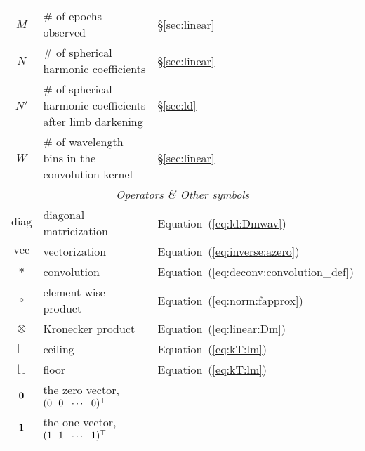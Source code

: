 \documentclass[modern]{aastex62}
\begin{document}
\begin{center}
\begin{longtable}{cll}
        $M$                                                 & \# of epochs observed                                        & \S\ref{sec:linear}                         \\
        $N$                                                 & \# of spherical harmonic coefficients                        & \S\ref{sec:linear}                         \\
        $N'$                                                & \# of spherical harmonic coefficients after limb darkening   & \S\ref{sec:ld}                             \\
        $W$                                                 & \# of wavelength bins in the convolution kernel              & \S\ref{sec:linear}                         \\
        \midrule
        \multicolumn{3}{c}{\emph{Operators \& Other symbols}}                                                                                                           \\
        \midrule
        $\mathrm{diag}$                                     & diagonal matricization                                       & Equation~(\ref{eq:ld:Dmwav})               \\
        $\mathrm{vec}$                                      & vectorization                                                & Equation~(\ref{eq:inverse:azero})          \\
        $*$                                                 & convolution                                                  & Equation~(\ref{eq:deconv:convolution_def}) \\
        $\circ$                                             & element-wise product                                         & Equation~(\ref{eq:norm:fapprox})           \\
        $\otimes$                                           & Kronecker product                                            & Equation~(\ref{eq:linear:Dm})              \\
        $\ceil*{\,}$                                        & ceiling                                                      & Equation~(\ref{eq:kT:lm})                  \\
        $\floor*{\,}$                                       & floor                                                        & Equation~(\ref{eq:kT:lm})                  \\
        $\bvec{0}$                                          & the zero vector,
        $(0 \quadquad 0 \quadquad \cdots \quadquad 0)^\top$ &                                                                                                           \\
        $\bvec{1}$                                          & the one vector,
        $(1 \quadquad 1 \quadquad \cdots \quadquad 1)^\top$ &                                                                                                           \\
    \end{longtable}
\end{center}

\clearpage

\end{document}
